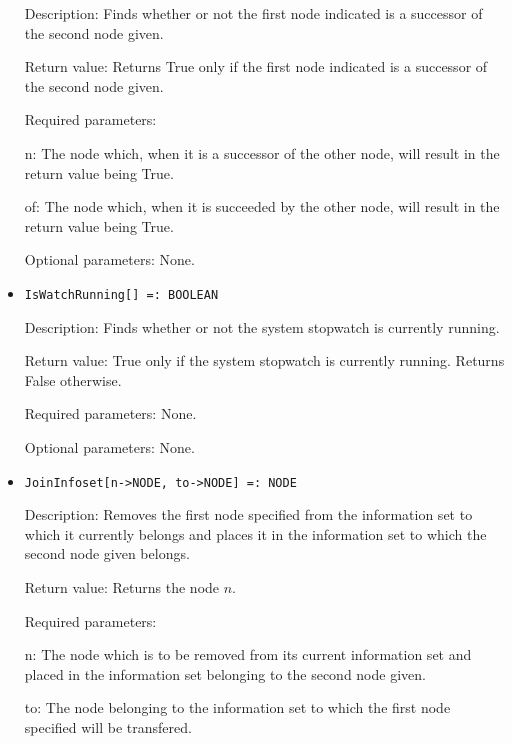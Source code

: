 \begin{itemize}
\bd
\item
[Description:] Finds whether or not the first node indicated is a
successor of the second node given.
\item
[Return value:] Returns True only if the first node indicated is a
successor of the second node given.
\item
[Required parameters:]\hfil\null
	
\bd
\item
[n:] The node which, when it is a successor of the other node, will
result in the return value being True.
\item
[of:] The node which, when it is succeeded by the other node, will
result in the return value being True.
\ed

\item
[Optional parameters:] None.
\ed

\item
\protect \large \begin{verbatim}
IsWatchRunning[] =: BOOLEAN
\end{verbatim}\normalsize

\bd
\item
[Description:] Finds whether or not the system stopwatch is currently
running.
\item
[Return value:] True only if the system stopwatch is currently
running.  Returns False otherwise.
\item
[Required parameters:] None.
\item
[Optional parameters:] None.
\ed


\item
\protect \large \begin{verbatim}
JoinInfoset[n->NODE, to->NODE] =: NODE
\end{verbatim}\normalsize

\bd
\item
[Description:] Removes the first node specified from the information
set to which it currently belongs and places it in the information set
to which the second node given belongs.
\item
[Return value:] Returns the node $n$.
\item
[Required parameters:]\hfil\null
	  
\bd
\item
[n:] The node which is to be removed from its current information set
and placed in the information set belonging to the second node given.
\item
[to:] The node belonging to the information set to which the first
node specified will be transfered.
\ed


\end{itemize}
